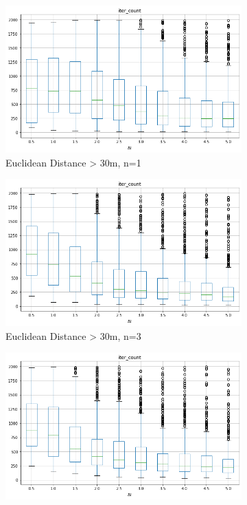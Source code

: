 \documentclass[a4paper,12pt]{article}
\DeclareRobustCommand{\[}{\begin{equation}}
\DeclareRobustCommand{\]}{\end{equation}}
\numberwithin{equation}{section}
\numberwithin{algorithm}{section}
\begin{document}
\begin{figure}[H]
\centering
    \begin{subfigure}[b]{0.6\textwidth}
        \includegraphics[scale=1,width=\textwidth]{images/brrrt_iters_high_n_1.png}
        \caption{Euclidean Distance > 30m, n=1}
        \label{fig:baseline_edge_len_fail_dist}
    \end{subfigure}
    \begin{subfigure}[b]{0.6\textwidth}
        \includegraphics[scale=1,width=\textwidth]{images/brrrt_iters_high_n_3.png}
        \caption{Euclidean Distance > 30m, n=3}
    \end{subfigure}
    \begin{subfigure}[b]{0.6\textwidth}
        \includegraphics[scale=1,width=\textwidth]{images/brrrt_iters_high_n_6.png}

\end{subfigure}
\end{figure}
\end{document}
